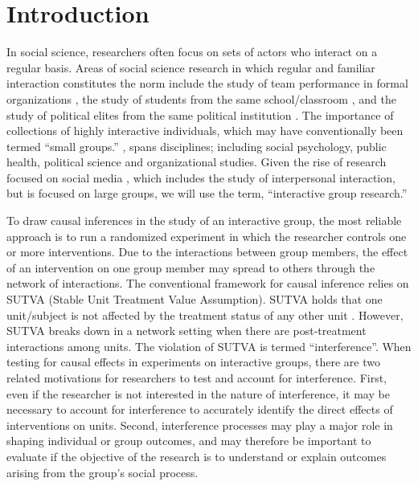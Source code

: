 \documentclass[12pt]{article}
\begin{document}
\section{Introduction}

In social science, researchers often focus on sets of actors who interact on a regular basis. Areas of social science research in which regular and familiar interaction constitutes the norm include the study of team performance in formal organizations \citep[e.g., ][]{anderson1992}, the study of students from the same school/classroom \citep[e.g., ][]{sallis1997}, and the study of political elites from the same political institution \citep[e.g.,][]{bratton1999}. The importance of collections of highly interactive individuals, which may have conventionally been termed ``small groups.'' \citep{levine1990}, spans disciplines; including social psychology, public health, political science and organizational studies. Given the rise of research focused on social media \citep{agichtein2008}, which includes the study of interpersonal interaction, but is focused on large groups, we will use the term, ``interactive group research.'' 

To draw causal inferences in the study of an interactive group, the most reliable approach is to run a randomized experiment in which the researcher controls one or more interventions. Due to the interactions between group members, the effect of an intervention on one group member may spread to others through the network of interactions. The conventional framework for causal inference relies on SUTVA (Stable Unit Treatment Value Assumption). SUTVA holds that one unit/subject is not affected by the treatment status of any other unit \citep{sekhon2008}. However, SUTVA breaks down in a network setting \citep{galea2010} when there are post-treatment interactions among units. The violation of SUTVA is termed ``interference''.  When testing for causal effects in experiments on interactive groups, there are two related motivations for researchers to test and account for interference. First, even if the researcher is not interested in the nature of interference, it may be necessary to account for interference to accurately identify the direct effects of interventions on units. Second, interference processes may play a major role in shaping individual or group outcomes, and may therefore be important to evaluate if the objective of the research is to understand or explain outcomes arising from the group's social process. 
\end{document}
